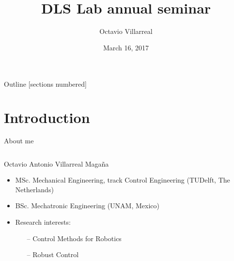 \documentclass[10pt]{beamer}
\title{DLS Lab annual seminar}
\subtitle{}
\date{March 16, 2017}
\author{Octavio Villarreal}
\institute{Istituto Italiano di Tecnologia}
\begin{document}
\maketitle

\begin{frame}{Outline}
  [sections numbered]
  \tableofcontents[hideallsubsections]
\end{frame}

\section{Introduction}
\begin{frame}{About me}
	\begin{columns}
		\begin{column}{0.6\textwidth}
		Octavio Antonio Villarreal Maga\~na
		\\
			\begin{itemize}\setlength\itemsep{2.5em}
				\item MSc. Mechanical Engineering, track Control Engineering (TUDelft, The Netherlands)
				\item BSc. Mechatronic Engineering (UNAM, Mexico)
				\item Research interests:
				\begin{itemize}
				\item [--] Control Methods for Robotics
				\item [--] Robust Control
		

\end{itemize}
\end{itemize}
\end{column}
\end{columns}
\end{frame}
\end{document}
